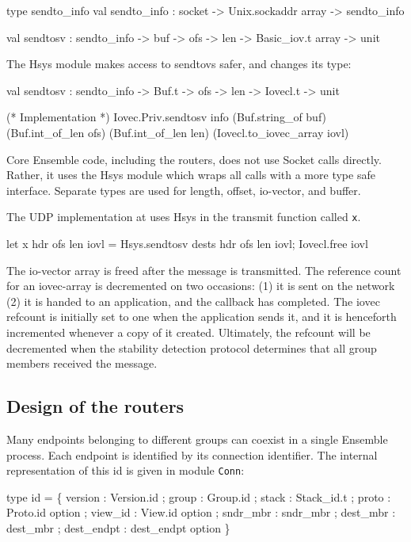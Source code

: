 \begin{codebox}
type sendto_info
val sendto_info : socket -> Unix.sockaddr array -> sendto_info

val sendtosv : sendto_info -> buf -> ofs -> len -> Basic_iov.t array -> unit
\end{codebox}


The Hsys module makes access to sendtovs safer, and changes its type:
\begin{codebox}
  val sendtosv : sendto_info -> Buf.t -> ofs -> len -> Iovecl.t -> unit

(* Implementation *)
  Iovec.Priv.sendtosv info 
    (Buf.string_of buf) (Buf.int_of_len ofs) (Buf.int_of_len len) 
    (Iovecl.to_iovec_array iovl) 
\end{codebox}
Core Ensemble code, including the routers, does not use Socket calls
directly. Rather, it uses the Hsys module which wraps all calls with a
more type safe interface. Separate types are used for length, offset,
io-vector, and buffer.

The UDP implementation at  uses Hsys in the 
transmit function called {\tt x}.

\begin{codebox}
  let x hdr ofs len iovl = 
    Hsys.sendtosv dests hdr ofs len iovl;
    Iovecl.free iovl
\end{codebox}

The io-vector array is freed after the message is transmitted. The
reference count for an iovec-array is decremented on two occasions:
(1) it is sent on the network (2) it is handed to an application, and
the callback has completed. The iovec refcount is initially set to one
when the application sends it, and it is henceforth incremented
whenever a copy of it created. Ultimately, the refcount will be
decremented when the stability detection protocol determines that all
group members received the message.

\subsection{Design of the routers}
Many endpoints belonging to different groups can coexist in a single
Ensemble process. Each endpoint is identified by its connection
identifier. The internal representation of this id is given in module
{\tt Conn}:

\begin{codebox}
type id = \{
  version       : Version.id ;
  group 	: Group.id ;
  stack 	: Stack_id.t ;
  proto 	: Proto.id option ;
  view_id 	: View.id option ;
  sndr_mbr 	: sndr_mbr ;
  dest_mbr 	: dest_mbr ;
  dest_endpt 	: dest_endpt option
\}
\end{codebox}

